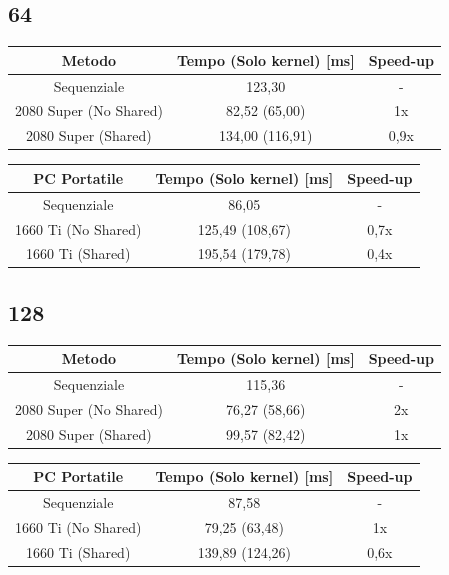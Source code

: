 \documentclass[12pt,a4paper]{report}
\begin{document}
			\subsection{64}
			
				\begin{tabular}{|c|c|c|}
					\hline
					Metodo & Tempo (Solo kernel) [ms] & Speed-up \\
					\hline
					Sequenziale & 123,30 & -  \\
					\hline
					2080 Super (No Shared) & 82,52 (65,00) & 1x \\
					\hline
					2080 Super (Shared) & 134,00 (116,91) & 0,9x \\
					\hline
				\end{tabular}
				
				\bigbreak
				
				\begin{tabular}{|c|c|c|}
					\hline
					PC Portatile & Tempo (Solo kernel) [ms] & Speed-up \\
					\hline
					Sequenziale & 86,05 & -  \\
					\hline
					1660 Ti (No Shared) & 125,49 (108,67) & 0,7x \\
					\hline
					1660 Ti (Shared) & 195,54 (179,78) & 0,4x \\
					\hline
				\end{tabular}

			\subsection{128}
			
				\begin{tabular}{|c|c|c|}
					\hline
					Metodo & Tempo (Solo kernel) [ms] & Speed-up \\
					\hline
					Sequenziale & 115,36 & -  \\
					\hline
					2080 Super (No Shared) & 76,27 (58,66) & 2x \\
					\hline
					2080 Super (Shared) & 99,57 (82,42) & 1x \\
					\hline
				\end{tabular}
				
				\bigbreak
				
				\begin{tabular}{|c|c|c|}
					\hline
					PC Portatile & Tempo (Solo kernel) [ms] & Speed-up \\
					\hline
					Sequenziale & 87,58 & -  \\
					\hline
					1660 Ti (No Shared) & 79,25 (63,48) & 1x \\
					\hline
					1660 Ti (Shared) & 139,89 (124,26) & 0,6x \\
					\hline
				\end{tabular}
\end{document}
